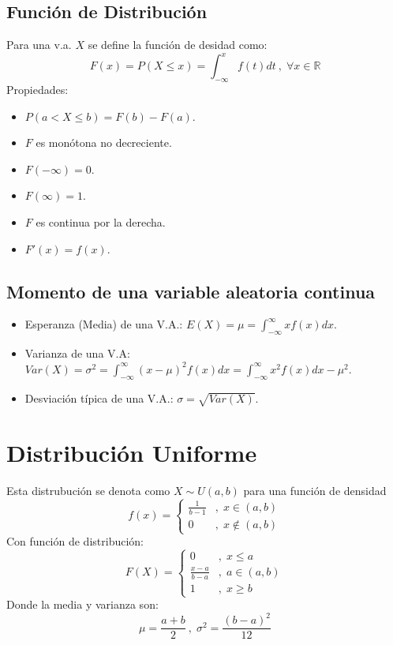 \documentclass[10pt,a4paper]{book}
\begin{document}
\subsection{Función de Distribución}
Para una v.a. $X$ se define la función de desidad como:
\[F(x) = P(X\leq x) =\int_{-\infty}^xf(t)dt\:,\;\forall x\in\mathbb{R}\]
Propiedades: 
\begin{itemize}
	\item $P(a<X\leq b) = F(b) -F(a)$.
	\item $F$ es monótona no decreciente.
	\item $F(-\infty) = 0$.
	\item $F(\infty) = 1$.
	\item $F$ es continua por la derecha.
	\item $F'(x) = f(x)$.
\end{itemize}
\subsection{Momento de una variable aleatoria continua}
\begin{itemize}
	\item Esperanza (Media) de una V.A.: $E(X) = \mu = \int_{-\infty}^\infty xf(x)dx$.
	\item Varianza de una V.A: $Var(X) = \sigma^2 = \int_{-\infty}^{\infty}(x-\mu)^2f(x)dx = \int_{-\infty}^\infty x^2f(x)dx-\mu^2$.
	\item Desviación típica de una V.A.: $\sigma = \sqrt{Var(X)}$.
\end{itemize}

\section{Distribución Uniforme}
Esta distrubución se denota como $X\sim U(a,b)$ para una función de densidad
\[f(x) = \left\{\begin{array}{cc}
	\frac{1}{b-1} & ,\;x\in(a,b)\\
	0 & ,\;x\notin (a,b)
\end{array}\right.\]
Con función de distribución:
\[F(X) = \left\{\begin{array}{cl}
		0 & ,\;x\leq a\\
		\frac{x-a}{b-a} &,\;a\in (a,b)\\
		1 & ,\; x\geq b
\end{array}\right.\]
Donde la media y varianza son:
\[	\mu = \frac{a+b}{2}\:,\;
\sigma^2 = \frac{(b-a)^2}{12}\]
\end{document}
